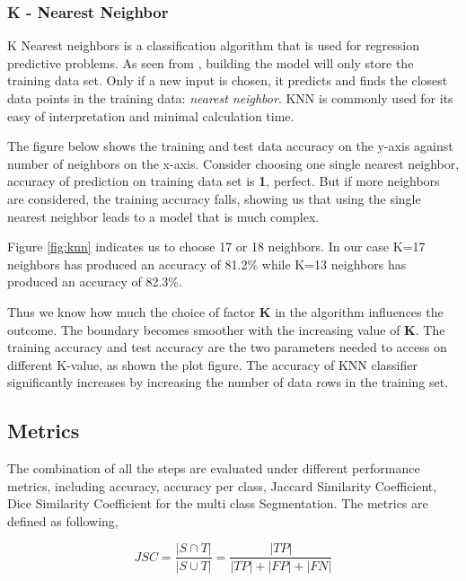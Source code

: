 \documentclass[conference]{IEEEtran}
\begin{document}
\subsubsection*{K - Nearest Neighbor}
K Nearest neighbors is a classification algorithm that is used for regression predictive problems. As seen from \cite{knn}, building the model will only store the training data set. Only if a new input is chosen, it predicts and finds the closest data points in the training data: \textit{nearest neighbor}. KNN is commonly used for its easy of interpretation and minimal calculation time.
\par
The figure below shows the training and test data accuracy on the y-axis against number of neighbors on the x-axis. Consider choosing one single nearest neighbor, accuracy of prediction on training data set is \textbf{1}, perfect. But if more neighbors are considered, the training accuracy falls, showing us that using the single nearest neighbor leads to a model that is much complex.


\par
Figure \ref{fig:knn} indicates us to choose 17 or 18 neighbors. In our case K=17 neighbors has produced an accuracy of 81.2\% while K=13 neighbors has produced an accuracy of 82.3\%.


Thus we know how much the choice of factor \textbf{K} in the algorithm influences the outcome. The boundary becomes smoother with the increasing value of \textbf{K}. The training accuracy and test accuracy are the two parameters needed to access on different K-value, as shown the plot figure. The accuracy of KNN classifier significantly increases by increasing the number of data rows in the training set.


\subsection{Metrics}
\label{sec:metrics}
The combination of all the steps are evaluated under different performance metrics, including accuracy, accuracy per class, Jaccard Similarity Coefficient, Dice Similarity Coefficient for the multi class Segmentation. The metrics are defined as following,

\begin{equation}
JSC = \frac{|S \cap T|}{|S \cup T|} = \frac{|TP|}{|TP| + |FP| + |FN|}
\end{equation}
\end{document}

